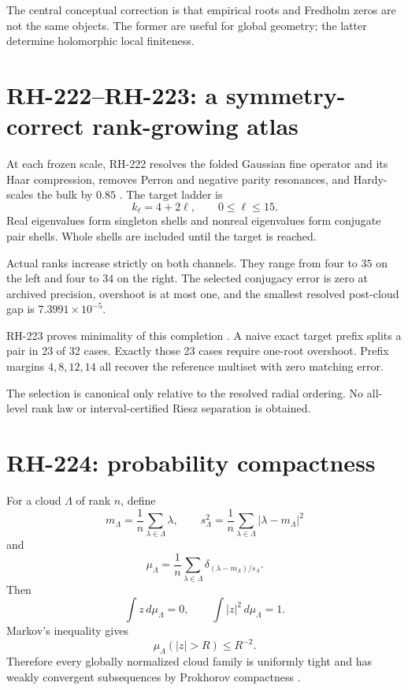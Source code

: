 \documentclass[11pt]{article}
\theoremstyle{remark}\newtheorem{remark}[theorem]{Remark}
\begin{document}
The central conceptual correction is that empirical roots and Fredholm zeros
are not the same objects. The former are useful for global geometry; the
latter determine holomorphic local finiteness.

\section{RH-222--RH-223: a symmetry-correct rank-growing atlas}

At each frozen scale, RH-222 resolves the folded Gaussian fine operator and
its Haar compression, removes Perron and negative parity resonances, and
Hardy-scales the bulk by $0.85$ \citep{WangRH222}. The target ladder is
\[
 k_\ell=4+2\ell,\qquad 0\le\ell\le15.
\]
Real eigenvalues form singleton shells and nonreal eigenvalues form conjugate
pair shells. Whole shells are included until the target is reached.

Actual ranks increase strictly on both channels. They range from four to
$35$ on the left and four to $34$ on the right. The selected conjugacy error
is zero at archived precision, overshoot is at most one, and the smallest
resolved post-cloud gap is $7.3991\times10^{-5}$.

RH-223 proves minimality of this completion \citep{WangRH223}. A naive exact
target prefix splits a pair in 23 of 32 cases. Exactly those 23 cases require
one-root overshoot. Prefix margins $4,8,12,14$ all recover the reference
multiset with zero matching error.

The selection is canonical only relative to the resolved radial ordering. No
all-level rank law or interval-certified Riesz separation is obtained.

\section{RH-224: probability compactness}

For a cloud $\Lambda$ of rank $n$, define
\[
 m_\Lambda=\frac1n\sum_{\lambda\in\Lambda}\lambda,\qquad
 s_\Lambda^2=\frac1n\sum_{\lambda\in\Lambda}
 |\lambda-m_\Lambda|^2
\]
and
\[
 \mu_\Lambda=\frac1n\sum_{\lambda\in\Lambda}
 \delta_{(\lambda-m_\Lambda)/s_\Lambda}.
\]
Then
\begin{equation}\label{eq:moments}
 \int z\,d\mu_\Lambda=0,\qquad
 \int|z|^2\,d\mu_\Lambda=1.
\end{equation}
Markov's inequality gives
\begin{equation}\label{eq:tight}
 \mu_\Lambda(|z|>R)\le R^{-2}.
\end{equation}
Therefore every globally normalized cloud family is uniformly tight and has
weakly convergent subsequences by Prokhorov compactness
\citep{WangRH224,Billingsley1999}.
\end{document}
